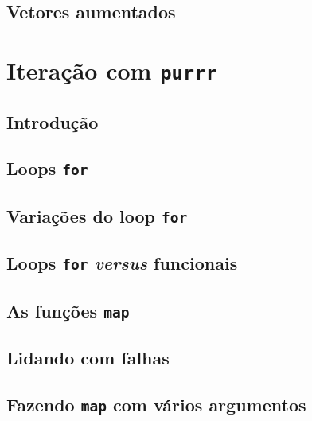 \documentclass[
]{latex/krantz}
\theoremstyle{definition}
\theoremstyle{definition}
\theoremstyle{definition}
\theoremstyle{definition}
\theoremstyle{remark}
\begin{document}
\hypertarget{vetores-aumentados}{%
\section{Vetores aumentados}\label{vetores-aumentados}}

\hypertarget{iterauxe7uxe3o-com-purrr}{%
\chapter{\texorpdfstring{Iteração com \texttt{purrr}}{Iteração com purrr}}\label{iterauxe7uxe3o-com-purrr}}

\hypertarget{introduuxe7uxe3o-13}{%
\section{Introdução}\label{introduuxe7uxe3o-13}}

\hypertarget{loops-for}{%
\section{\texorpdfstring{Loops \texttt{for}}{Loops for}}\label{loops-for}}

\hypertarget{variauxe7uxf5es-do-loop-for}{%
\section{\texorpdfstring{Variações do loop \texttt{for}}{Variações do loop for}}\label{variauxe7uxf5es-do-loop-for}}

\hypertarget{loops-for-versus-funcionais}{%
\section{\texorpdfstring{Loops \texttt{for} \emph{versus} funcionais}{Loops for versus funcionais}}\label{loops-for-versus-funcionais}}

\hypertarget{as-funuxe7uxf5es-map}{%
\section{\texorpdfstring{As funções \texttt{map}}{As funções map}}\label{as-funuxe7uxf5es-map}}

\hypertarget{lidando-com-falhas}{%
\section{Lidando com falhas}\label{lidando-com-falhas}}

\hypertarget{fazendo-map-com-vuxe1rios-argumentos}{%
\section{\texorpdfstring{Fazendo \texttt{map} com vários argumentos}{Fazendo map com vários argumentos}}\label{fazendo-map-com-vuxe1rios-argumentos}}
\end{document}
